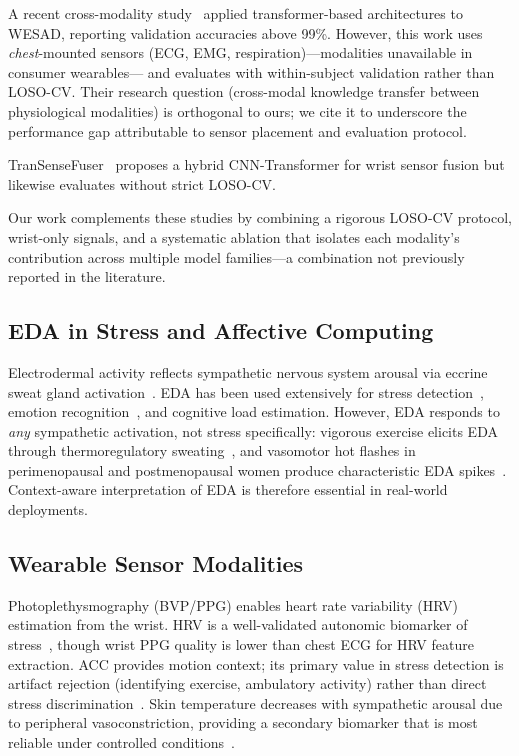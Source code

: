 \documentclass[10pt,twocolumn]{article}
\begin{document}
A recent cross-modality study~\cite{cross_modality_2025} applied
transformer-based architectures to WESAD, reporting validation accuracies
above 99\%. However, this work uses \emph{chest}-mounted sensors
(ECG, EMG, respiration)---modalities unavailable in consumer wearables---
and evaluates with within-subject validation rather than LOSO-CV.
Their research question (cross-modal knowledge transfer between physiological
modalities) is orthogonal to ours; we cite it to underscore the performance
gap attributable to sensor placement and evaluation protocol.

TranSenseFuser~\cite{transensefuser2023} proposes a hybrid CNN-Transformer
for wrist sensor fusion but likewise evaluates without strict LOSO-CV.

Our work complements these studies by combining a rigorous LOSO-CV protocol,
wrist-only signals, and a systematic ablation that isolates each modality's
contribution across multiple model families---a combination not previously
reported in the literature.

\subsection{EDA in Stress and Affective Computing}

Electrodermal activity reflects sympathetic nervous system arousal via
eccrine sweat gland activation~\cite{boucsein2012}.
EDA has been used extensively for stress detection~\cite{setz2010},
emotion recognition~\cite{koelstra2012}, and cognitive load estimation.
However, EDA responds to \emph{any} sympathetic activation, not stress
specifically: vigorous exercise elicits EDA through thermoregulatory
sweating~\cite{kellogg1994exercise}, and vasomotor hot flashes in
perimenopausal and postmenopausal women produce characteristic
EDA spikes~\cite{freedman2014hotflash}. Context-aware interpretation
of EDA is therefore essential in real-world deployments.

\subsection{Wearable Sensor Modalities}

Photoplethysmography (BVP/PPG) enables heart rate variability (HRV)
estimation from the wrist. HRV is a well-validated autonomic biomarker
of stress~\cite{kim2018hrv}, though wrist PPG quality is lower than
chest ECG for HRV feature extraction.
ACC provides motion context; its primary value in stress detection is
artifact rejection (identifying exercise, ambulatory activity) rather
than direct stress discrimination~\cite{de2019wrist}.
Skin temperature decreases with sympathetic arousal due to peripheral
vasoconstriction, providing a secondary biomarker that is most reliable
under controlled conditions~\cite{vinkers2013temp}.
\end{document}
